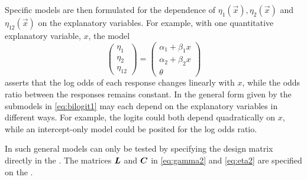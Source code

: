 Specific models are then formulated for the dependence of $\eta _1\left( \vec{x}%
\right) ,\eta _2\left( \vec{x}\right) $ and $\eta _{12}\left( \vec{x}%
\right) $ on the explanatory variables. For example, with one quantitative
explanatory variable, $x$, the model
\begin{equation}\label{eq:bilogit1}
\left(
\begin{array}{c}
\eta _1 \\
\eta _2 \\
\eta _{12}
\end{array}
\right) =\left(
\begin{array}{c}
\alpha _1+\beta _1 x \\
\alpha _2+\beta _2 x \\
\theta
\end{array}
\right)
\end{equation}
asserts that the log odds of each response changes linearly with $x$, while
the odds ratio between the responses remains constant. In the general form
given by \cite{McCullaghNelder:89} the submodels in \eqref{eq:bilogit1} may
each depend on the explanatory variables in different ways.
For example, the logits could both depend quadratically on $x$,
while an intercept-only model could be posited for the log odds ratio.

In  such general models can only be tested by specifying the
design matrix directly in the .  The matrices $\bm{L}$ and $\bm{C}$ in
\eqref{eq:gamma2} and \eqref{eq:eta2} are specified on the .

